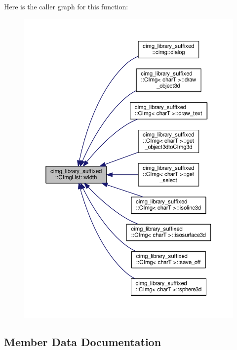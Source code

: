 Here is the caller graph for this function\+:
\nopagebreak
\begin{figure}[H]
\begin{center}
\leavevmode
\includegraphics[width=350pt]{d5/d7e/structcimg__library__suffixed_1_1CImgList_a60d81967a11f946a46ab28f2f14109f7_icgraph}
\end{center}
\end{figure}


\subsection{Member Data Documentation}
\mbox{\label{structcimg__library__suffixed_1_1CImgList_ada9b831aa8229d9eb3edfeb08cd9c4c3}} 
